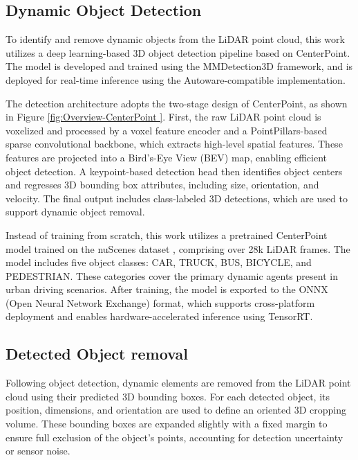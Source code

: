\subsection{Dynamic Object Detection}

To identify and remove dynamic objects from the LiDAR point cloud, this work utilizes a deep learning-based 3D object detection pipeline based on CenterPoint\cite{yin2021center}. The model is developed and trained using the MMDetection3D framework\cite{mmdet3d2020}, and is deployed for real-time inference using the Autoware-compatible implementation\cite{autoware_universe}.

The detection architecture adopts the two-stage design of CenterPoint\cite{yin2021center}, as shown in Figure \ref{fig:Overview-CenterPoint }. First, the raw LiDAR point cloud is voxelized and processed by a voxel feature encoder and a PointPillars-based sparse convolutional backbone\cite{lang2019pointpillars}, which extracts high-level spatial features. These features are projected into a Bird’s-Eye View (BEV) map, enabling efficient object detection. A keypoint-based detection head then identifies object centers and regresses 3D bounding box attributes, including size, orientation, and velocity. The final output includes class-labeled 3D detections, which are used to support dynamic object removal.

Instead of training from scratch, this work utilizes a pretrained CenterPoint model trained on the nuScenes dataset \cite{caesar2020nuscenes}, comprising over 28k LiDAR frames. The model includes five object classes: CAR, TRUCK, BUS, BICYCLE, and PEDESTRIAN. These categories cover the primary dynamic agents present in urban driving scenarios. After training, the model is exported to the ONNX (Open Neural Network Exchange) format, which supports cross-platform deployment and enables hardware-accelerated inference using TensorRT.




\subsection{Detected Object removal }

Following object detection, dynamic elements are removed from the LiDAR point cloud using their predicted 3D bounding boxes. For each detected object, its position, dimensions, and orientation are used to define an oriented 3D cropping volume. These bounding boxes are expanded slightly with a fixed margin to ensure full exclusion of the object’s points, accounting for detection uncertainty or sensor noise.

